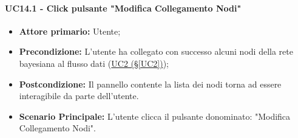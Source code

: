 \paragraph{UC14.1 - Click pulsante "Modifica Collegamento Nodi"}\label{UC14.1}
\begin{itemize}
\item \textbf{Attore primario:} Utente;
\item \textbf{Precondizione:} L'utente ha collegato con successo alcuni nodi della rete bayesiana al flusso dati 			(\hyperref[UC2]{UC2 (§\ref*{UC2})});
\item \textbf{Postcondizione:} Il pannello contente la lista dei nodi torna ad essere interagibile da parte dell'utente.
\item \textbf{Scenario Principale:} L'utente clicca il pulsante donominato: "Modifica Collegamento Nodi".
\end{itemize}
\newpage

